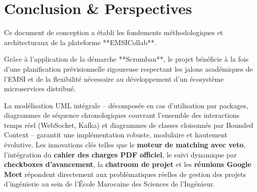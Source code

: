 \documentclass[11pt,a4paper,titlepage]{article}
\begin{document}
\newpage
\section{Conclusion \& Perspectives}

Ce document de conception a établi les fondements méthodologiques et architecturaux de la plateforme **EMSICollab**. 

Grâce à l'application de la démarche **Scrumban**, le projet bénéficie à la fois d'une planification prévisionnelle rigoureuse respectant les jalons académiques de l'EMSI et de la flexibilité nécessaire au développement d'un écosystème microservices distribué.

La modélisation UML intégrale -- décomposée en cas d'utilisation par packages, diagrammes de séquence chronologiques couvrant l'ensemble des interactions temps réel (WebSocket, Kafka) et diagrammes de classes cloisonnés par Bounded Context -- garantit une implémentation robuste, modulaire et hautement évolutive. Les innovations clés telles que le \textbf{moteur de matching avec veto}, l'intégration du \textbf{cahier des charges PDF officiel}, le suivi dynamique par \textbf{checkboxes d'avancement}, la \textbf{chatroom de projet} et les \textbf{réunions Google Meet} répondent directement aux problématiques réelles de gestion des projets d'ingénierie au sein de l'École Marocaine des Sciences de l'Ingénieur.
\end{document}
